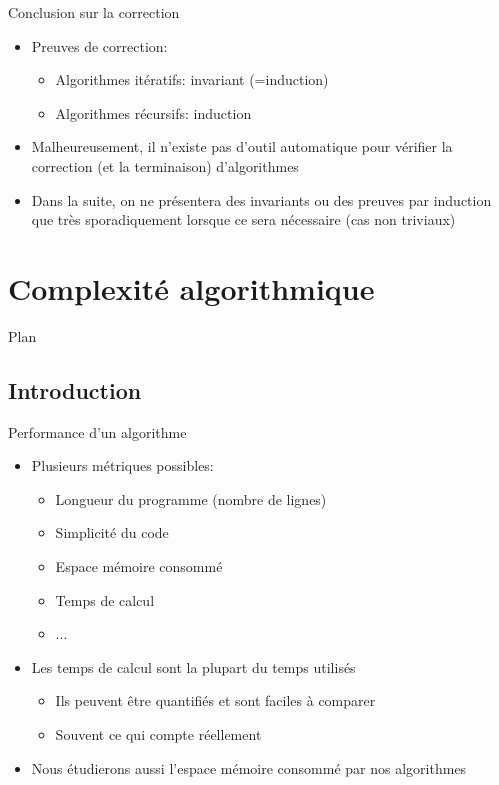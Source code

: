 \begin{frame}{Conclusion sur la correction}

\begin{itemize}
\item Preuves de correction:
\begin{itemize}
\item Algorithmes itératifs: invariant (=induction)
\item Algorithmes récursifs: induction
\end{itemize}

\bigskip

\item Malheureusement, il n'existe pas d'outil automatique pour vérifier la correction (et la terminaison) d'algorithmes
\item Dans la suite, on ne présentera des invariants ou des preuves par induction que très sporadiquement lorsque ce sera nécessaire (cas non triviaux)
\end{itemize}

\end{frame}

\section{Complexité algorithmique}

\begin{frame}{Plan}

\tableofcontents[currentsection]

\end{frame}

\subsection{Introduction}

\begin{frame}{Performance d'un algorithme}

\begin{itemize}
\item Plusieurs métriques possibles:
\begin{itemize}
\item Longueur du programme (nombre de lignes)
\item Simplicité du code
\item \alert{Espace mémoire consommé}
\item \alert{Temps de calcul}
\item ...
\end{itemize}

\bigskip

\item Les temps de calcul sont la plupart du temps utilisés
\begin{itemize}
\item Ils peuvent être quantifiés et sont faciles à comparer
\item Souvent ce qui compte réellement
\end{itemize}
\item Nous étudierons aussi l'espace mémoire consommé par nos algorithmes
\end{itemize}

\end{frame}

